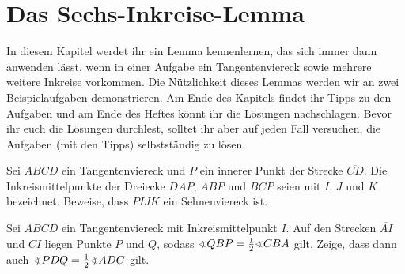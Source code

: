 \section{Das Sechs-Inkreise-Lemma}\label{kapitel:SechsInkreise}
In diesem Kapitel werdet ihr ein Lemma kennenlernen, das sich immer dann anwenden lässt, wenn in einer Aufgabe ein Tangentenviereck sowie mehrere weitere Inkreise vorkommen. Die Nützlichkeit dieses Lemmas werden wir an zwei Beispielaufgaben demonstrieren. Am Ende des Kapitels findet ihr Tipps zu den Aufgaben und am Ende des Heftes könnt ihr die Lösungen nachschlagen. Bevor ihr euch die Lösungen durchlest, solltet ihr aber auf jeden Fall versuchen, die Aufgaben (mit den Tipps) selbstständig zu lösen.
\begin{aufgabe*}\label{aufgabe:SechsInkreiseSehnenviereck}
	Sei $ABCD$ ein Tangentenviereck und $P$ ein innerer Punkt der Strecke $\overline{CD}$. Die Inkreismittelpunkte der Dreiecke $DAP$, $ABP$ und $BCP$ seien mit $I$, $J$ und $K$ bezeichnet. Beweise, dass $PIJK$ ein Sehnenviereck ist.
\end{aufgabe*}
\begin{aufgabe*}\label{aufgabe:531246}
	Sei $ABCD$ ein Tangentenviereck mit Inkreismittelpunkt $I$. Auf den Strecken $\overline{AI}$ und $\overline{CI}$ liegen Punkte $P$ und $Q$, sodass $\winkel QBP=\frac12\winkel CBA$ gilt. Zeige, dass dann auch $\winkel PDQ=\frac 12\winkel ADC$ gilt.
\end{aufgabe*}

